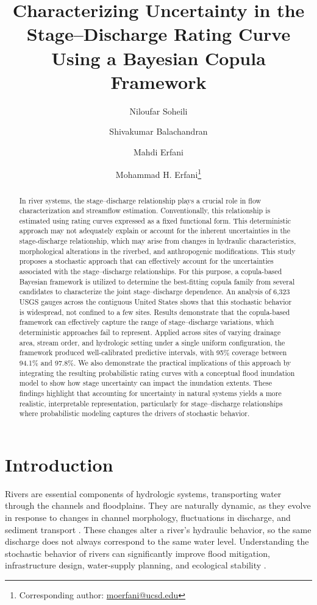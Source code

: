 \documentclass[11pt]{article}
\title{Characterizing Uncertainty in the Stage--Discharge Rating Curve Using a Bayesian Copula Framework}
\author[1]{Niloufar Soheili}
\author[2]{Shivakumar Balachandran}
\author[3]{Mahdi Erfani}
\author[3]{Mohammad H. Erfani\thanks{Corresponding author: \href{mailto:moerfani@ucsd.edu}{moerfani@ucsd.edu}}}
\affil[1]{Department of Civil Engineering, The City College of New York, New York, NY, USA}
\affil[2]{Department of Civil Engineering, University of South Carolina, Columbia, SC, USA}
\affil[3]{Scripps Institution of Oceanography, UC San Diego, La Jolla, CA, USA}
\date{}
\begin{document}
\maketitle

\begin{abstract}
    In river systems, the stage--discharge relationship plays a crucial role in flow characterization and streamflow estimation. Conventionally, this relationship is estimated using rating curves expressed as a fixed functional form. This deterministic approach may not adequately explain or account for the inherent uncertainties in the stage-discharge relationship, which may arise from changes in hydraulic characteristics, morphological alterations in the riverbed, and anthropogenic modifications. This study proposes a stochastic approach that can effectively account for the uncertainties associated with the stage--discharge relationships. For this purpose, a copula-based Bayesian framework is utilized to determine the best-fitting copula family from several candidates to characterize the joint stage–discharge dependence. An analysis of 6,323 USGS gauges across the contiguous United States shows that this stochastic behavior is widespread, not confined to a few sites. Results demonstrate that the copula-based framework can effectively capture the range of stage--discharge variations, which deterministic approaches fail to represent. Applied across sites of varying drainage area, stream order, and hydrologic setting under a single uniform configuration, the framework produced well-calibrated predictive intervals, with 95\% coverage between 94.1\% and 97.8\%. We also demonstrate the practical implications of this approach by integrating the resulting probabilistic rating curves with a conceptual flood inundation model to show how stage uncertainty can impact the inundation extents. These findings highlight that accounting for uncertainty in natural systems yields a more realistic, interpretable representation, particularly for stage–discharge relationships where probabilistic modeling captures the drivers of stochastic behavior.
\end{abstract}

\section{Introduction}
Rivers are essential components of hydrologic systems, transporting water through the channels and floodplains. They are naturally dynamic, as they evolve in response to changes in channel morphology, fluctuations in discharge, and sediment transport \cite{rhoads2020}. These changes alter a river's hydraulic behavior, so the same discharge does not always correspond to the same water level. Understanding the stochastic behavior of rivers can significantly improve flood mitigation, infrastructure design, water-supply planning, and ecological stability \cite{arnell2016}.
\end{document}
